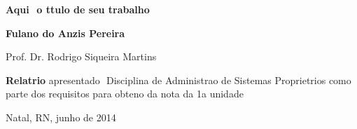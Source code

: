 \begin{titlepage}
\begin{center}
\begin{tabularx}{\linewidth}{ c X }
\end{tabularx}


\vfill

\LARGE

\textbf{Aqui  o ttulo de seu trabalho}

\vfill

\Large

\textbf{Fulano do Anzis Pereira}

\vfill

\normalsize

Prof. Dr. Rodrigo Siqueira Martins

\vfill

\hfill
\parbox{0.5\linewidth}{\textbf{%
Relatrio} apresentado  Disciplina de Administrao de Sistemas Proprietrios
como parte dos requisitos para obteno da nota da 1a unidade}


\vfill

\large

Natal, RN, junho de 2014

\end{center}

\end{titlepage}

